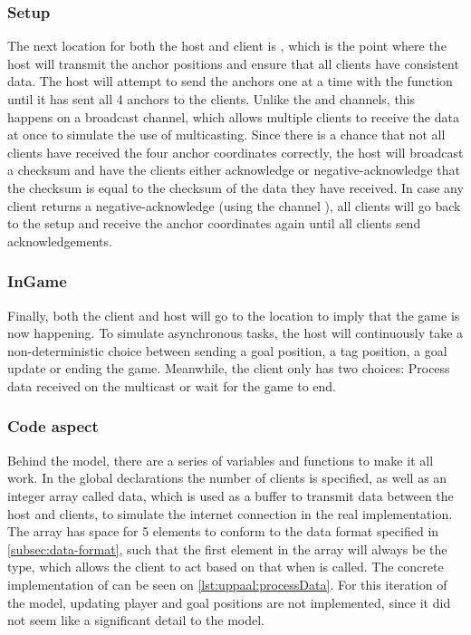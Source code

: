 \subsubsection{Setup}
The next location for both the host and client is , which is the point where the host will transmit the anchor positions and ensure that all clients have consistent data.
The host will attempt to send the anchors one at a time with the  function until it has sent all 4 anchors to the clients.
Unlike the  and  channels, this happens on a broadcast channel, which allows multiple clients to receive the data at once to simulate the use of multicasting.
Since there is a chance that not all clients have received the four anchor coordinates correctly, the host will broadcast a checksum and have the clients either acknowledge or negative-acknowledge that the checksum is equal to the checksum of the data they have received.
In case any client returns a negative-acknowledge (using the channel ), all clients will go back to the setup and receive the anchor coordinates again until all clients send acknowledgements.

\subsubsection{InGame}
Finally, both the client and host will go to the  location to imply that the game is now happening.
To simulate asynchronous tasks, the host will continuously take a non-deterministic choice between sending a goal position, a tag position, a goal update or ending the game.
Meanwhile, the client only has two choices: Process data received on the multicast or wait for the game to end.

\subsubsection{Code aspect}
Behind the model, there are a series of variables and functions to make it all work.
In the global declarations the number of clients is specified, as well as an integer array called data, which is used as a buffer to transmit data between the host and clients, to simulate the internet connection in the real implementation.
The array has space for 5 elements to conform to the data format specified in \autoref{subsec:data-format}, such that the first element in the array will always be the type, which allows the client to act based on that when  is called.
The concrete implementation of  can be seen on \autoref{lst:uppaal:processData}.
For this iteration of the \uppaal model, updating player and goal positions are not implemented, since it did not seem like a significant detail to the model.

